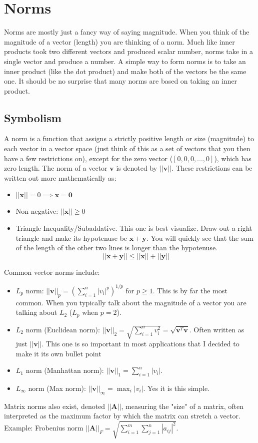 \documentclass{article}
\newcommand{\vect}[1]{\bm{#1}} %
\newcommand{\mat}[1]{\bm{#1}}  %
\begin{document}
\section{Norms}
Norms are mostly just a fancy way of saying magnitude. When you think of the magnitude of a vector (length) you are thinking of a norm. Much like inner products took two different vectors and produced scalar number, norms take in a single vector and produce a number. A simple way to form norms is to take an inner product (like the dot product) and make both of the vectors be the same one. It should be no surprise that many norms are based on taking an inner product.

\subsection*{Symbolism}
A norm is a function that assigns a strictly positive length or size (magnitude) to each vector in a vector space (just think of this as a set of vectors that you then have a few restrictions on), except for the zero vector ($[0,0,0,...,0]$), which has zero length. The norm of a vector $\vect{v}$ is denoted by $||\vect{v}||$. These restrictions can be written out more mathematically as:
\begin{itemize}
    \item $||\vect{x}|| = 0 \implies \vect{x} = \vect{0}$
    \item Non negative: $||\vect{x}|| \geq 0$
    \item Triangle Inequality/Subaddative. This one is best visualize. Draw out a right triangle and make its hypotenuse be $\vect{x} + \vect{y}$. You will quickly see that the sum of the length of the other two lines is longer than the hypotenuse.
    \[
    ||\vect{x} + \vect{y}|| \leq ||\vect{x}|| + ||\vect{y}||
    \]
\end{itemize}
Common vector norms include:
\begin{itemize}
    \item $L_p$ norm: $||\vect{v}||_p = \left( \sum_{i=1}^n |v_i|^p \right)^{1/p}$ for $p \ge 1$. This is by far the most common. When you typically talk about the magnitude of a vector you are talking about $L_{2}$ ($L_{p}$ when $p=2$).
    \item $L_2$ norm (Euclidean norm): $||\vect{v}||_2 = \sqrt{\sum_{i=1}^n v_i^2} = \sqrt{\vect{v}^T \vect{v}}$. Often written as just $||\vect{v}||$. This one is so important in most applications that I decided to make it its own bullet point
    \item $L_1$ norm (Manhattan norm): $||\vect{v}||_1 = \sum_{i=1}^n |v_i|$.
    \item $L_\infty$ norm (Max norm): $||\vect{v}||_\infty = \max_{i} |v_i|$. Yes it is this simple. 
\end{itemize}
Matrix norms also exist, denoted $||\mat{A}||$, measuring the "size" of a matrix, often interpreted as the maximum factor by which the matrix can stretch a vector. Example: Frobenius norm $||\mat{A}||_F = \sqrt{\sum_{i=1}^m \sum_{j=1}^n |a_{ij}|^2}$.
\end{document}
